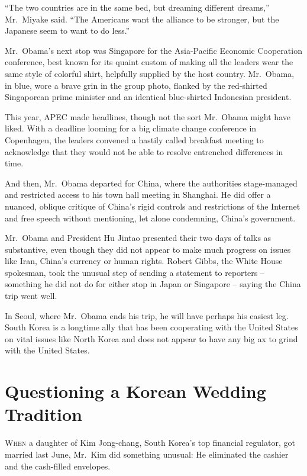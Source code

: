 ﻿\documentclass[12pt]{article}
\begin{document}
``The two countries are in the same bed, but dreaming different dreams,'' Mr.~Miyake said. ``The
Americans want the alliance to be stronger, but the Japanese seem to want to do less.''

Mr.~Obama's next stop was Singapore for the Asia-Pacific Economic Cooperation conference, best known
for its quaint custom of making all the leaders wear the same style of colorful shirt, helpfully
supplied by the host country. Mr.~Obama, in blue, wore a brave grin in the group photo, flanked by
the red-shirted Singaporean prime minister and an identical blue-shirted Indonesian president.

This year, APEC made headlines, though not the sort Mr.~Obama might have liked. With a deadline
looming for a big climate change conference in Copenhagen, the leaders convened a hastily called
breakfast meeting to acknowledge that they would not be able to resolve entrenched differences in
time.

And then, Mr.~Obama departed for China, where the authorities stage-managed and restricted access to
his town hall meeting in Shanghai. He did offer a nuanced, oblique critique of China's rigid
controls and restrictions of the Internet and free speech without mentioning, let alone condemning,
China's government.

Mr.~Obama and President Hu Jintao presented their two days of talks as substantive, even though they
did not appear to make much progress on issues like Iran, China's currency or human rights. Robert
Gibbs, the White House spokesman, took the unusual step of sending a statement to reporters --
something he did not do for either stop in Japan or Singapore -- saying the China trip went well.

In Seoul, where Mr.~Obama ends his trip, he will have perhaps his easiest leg. South Korea is a
longtime ally that has been cooperating with the United States on vital issues like North Korea and
does not appear to have any big ax to grind with the United States.

\section{Questioning a Korean Wedding Tradition}

\lettrine{W}{hen} a daughter of Kim Jong-chang, South Korea's top financial
regulator, got married last June, Mr.~Kim did something unusual: He eliminated the cashier and the
cash-filled envelopes.
\end{document}
